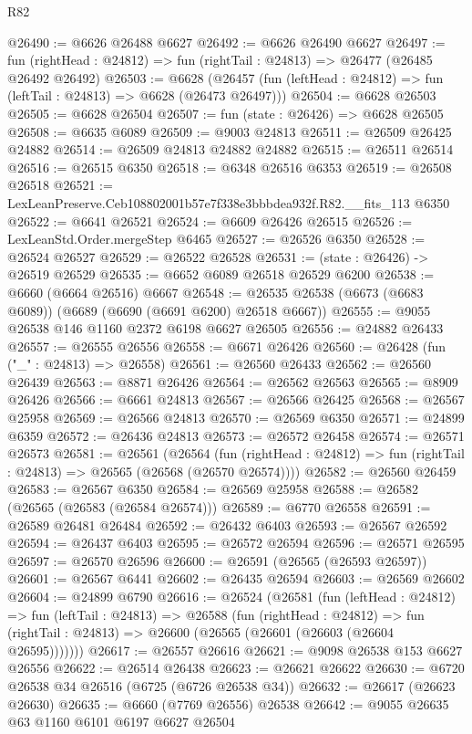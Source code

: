 \begin{lexlean}{R82}
\begin{coremodule}
@26490 := @6626 @26488 @6627
@26492 := @6626 @26490 @6627
@26497 := fun (rightHead : @24812) => fun (rightTail : @24813) => @26477 (@26485 @26492 @26492)
@26503 := @6628
    (@26457 (fun (leftHead : @24812) => fun (leftTail : @24813) => @6628 (@26473 @26497)))
@26504 := @6628 @26503
@26505 := @6628 @26504
@26507 := fun (state : @26426) => @6628 @26505
@26508 := @6635 @6089
@26509 := @9003 @24813
@26511 := @26509 @26425 @24882
@26514 := @26509 @24813 @24882 @24882
@26515 := @26511 @26514
@26516 := @26515 @6350
@26518 := @6348 @26516 @6353
@26519 := @26508 @26518
@26521 := LexLeanPreserve.Ceb108802001b57e7f338e3bbbdea932f.R82.__fits_113 @6350
@26522 := @6641 @26521
@26524 := @6609 @26426 @26515
@26526 := LexLeanStd.Order.mergeStep @6465
@26527 := @26526 @6350
@26528 := @26524 @26527
@26529 := @26522 @26528
@26531 := (state : @26426) -> @26519 @26529
@26535 := @6652 @6089 @26518 @26529 @6200
@26538 := @6660 (@6664 @26516) @6667
@26548 := @26535 @26538 (@6673 (@6683 @6089)) (@6689 (@6690 (@6691 @6200) @26518 @6667))
@26555 := @9055 @26538 @146 @1160 @2372 @6198 @6627 @26505
@26556 := @24882 @26433
@26557 := @26555 @26556
@26558 := @6671 @26426
@26560 := @26428 (fun ("_" : @24813) => @26558)
@26561 := @26560 @26433
@26562 := @26560 @26439
@26563 := @8871 @26426
@26564 := @26562 @26563
@26565 := @8909 @26426
@26566 := @6661 @24813
@26567 := @26566 @26425
@26568 := @26567 @25958
@26569 := @26566 @24813
@26570 := @26569 @6350
@26571 := @24899 @6359
@26572 := @26436 @24813
@26573 := @26572 @26458
@26574 := @26571 @26573
@26581 := @26561
    (@26564
      (fun (rightHead : @24812) => fun (rightTail : @24813) => @26565 (@26568 (@26570 @26574))))
@26582 := @26560 @26459
@26583 := @26567 @6350
@26584 := @26569 @25958
@26588 := @26582 (@26565 (@26583 (@26584 @26574)))
@26589 := @6770 @26558
@26591 := @26589 @26481 @26484
@26592 := @26432 @6403
@26593 := @26567 @26592
@26594 := @26437 @6403
@26595 := @26572 @26594
@26596 := @26571 @26595
@26597 := @26570 @26596
@26600 := @26591 (@26565 (@26593 @26597))
@26601 := @26567 @6441
@26602 := @26435 @26594
@26603 := @26569 @26602
@26604 := @24899 @6790
@26616 := @26524
    (@26581
      (fun (leftHead : @24812) =>
      fun (leftTail : @24813) =>
      @26588
        (fun (rightHead : @24812) =>
        fun (rightTail : @24813) => @26600 (@26565 (@26601 (@26603 (@26604 @26595)))))))
@26617 := @26557 @26616
@26621 := @9098 @26538 @153 @6627 @26556
@26622 := @26514 @26438
@26623 := @26621 @26622
@26630 := @6720 @26538 @34 @26516 (@6725 (@6726 @26538 @34))
@26632 := @26617 (@26623 @26630)
@26635 := @6660 (@7769 @26556) @26538
@26642 := @9055 @26635 @63 @1160 @6101 @6197 @6627 @26504

\end{coremodule}
\end{lexlean}
